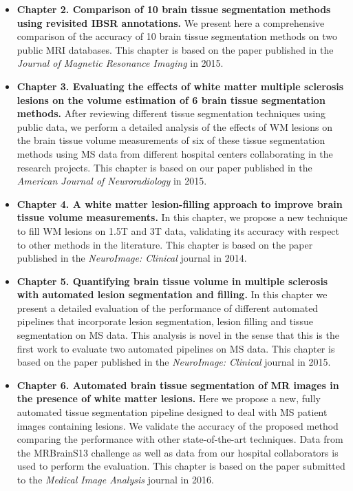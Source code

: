 \begin{itemize}
\item \textbf{Chapter 2. Comparison of 10 brain tissue segmentation methods using revisited IBSR annotations.}  We present here a comprehensive comparison of the accuracy of 10 brain tissue segmentation methods on two public MRI databases. This chapter is based on the paper published in  the\textit{ Journal of Magnetic Resonance Imaging} in 2015. 

\item \textbf{Chapter 3. Evaluating the effects of white matter multiple sclerosis lesions on the volume estimation of 6 brain tissue segmentation methods.} After reviewing different tissue segmentation techniques using public data, we perform a detailed analysis of the effects of WM lesions on the brain tissue volume measurements of six of these tissue segmentation methods using MS data from different hospital centers collaborating in the research projects. This chapter is based on our paper published in  the \textit{American Journal of Neuroradiology} in 2015. 

\item \textbf{Chapter 4. A white matter lesion-filling approach to improve brain tissue volume measurements.} In this chapter, we propose a new technique to fill WM lesions on 1.5T and 3T data, validating its accuracy with respect to other methods in the literature. This chapter is based on the paper published in the \textit{NeuroImage: Clinical} journal in 2014. 

\item \textbf{Chapter 5. Quantifying brain tissue volume in multiple sclerosis with automated lesion segmentation and filling.} In this chapter we present a detailed  evaluation of the performance of different automated pipelines that incorporate lesion segmentation, lesion filling and tissue segmentation on MS data. This analysis is novel in the sense that this is the first work to evaluate two automated pipelines on MS data. This chapter is based on the paper published in the \textit{NeuroImage: Clinical} journal in 2015.

\item \textbf{Chapter 6. Automated brain tissue segmentation of MR images in the presence of white matter lesions.} Here we propose a new, fully automated tissue segmentation pipeline designed to deal with MS patient images containing lesions. We validate the accuracy of the proposed method comparing the performance with other state-of-the-art techniques. Data from the MRBrainS13 challenge as well as data from our hospital collaborators is used to perform the evaluation. This chapter is based on the paper submitted to the \textit{Medical Image Analysis} journal in 2016.  


\end{itemize}
